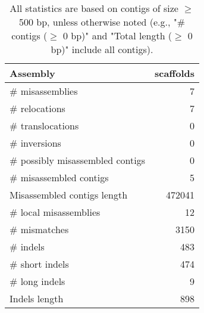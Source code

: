 \documentclass[12pt,a4paper]{article}
\begin{document}
\begin{table}[ht]
\begin{center}
\caption{All statistics are based on contigs of size $\geq$ 500 bp, unless otherwise noted (e.g., "\# contigs ($\geq$ 0 bp)" and "Total length ($\geq$ 0 bp)" include all contigs).}
\begin{tabular}{|l*{1}{|r}|}
\hline
Assembly & scaffolds \\ \hline
\# misassemblies & 7 \\ \hline
\hspace{5mm}\# relocations & 7 \\ \hline
\hspace{5mm}\# translocations & 0 \\ \hline
\hspace{5mm}\# inversions & 0 \\ \hline
\# possibly misassembled contigs & 0 \\ \hline
\# misassembled contigs & 5 \\ \hline
Misassembled contigs length & 472041 \\ \hline
\# local misassemblies & 12 \\ \hline
\# mismatches & 3150 \\ \hline
\# indels & 483 \\ \hline
\hspace{5mm}\# short indels & 474 \\ \hline
\hspace{5mm}\# long indels & 9 \\ \hline
Indels length & 898 \\ \hline
\end{tabular}
\end{center}
\end{table}
\end{document}
